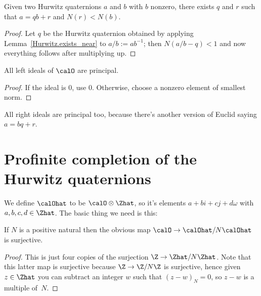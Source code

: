 \begin{lemma}
    \label{Hurwitz.quot_rem}
    \leanok
    Given two Hurwitz quaternions $a$ and $b$ with $b$ nonzero, there exists
    $q$ and $r$ such that $a=qb+r$ and $N(r)<N(b)$.
\end{lemma}
\begin{proof}
    \leanok
  Let $q$ be the Hurwitz quaternion obtained by applying Lemma~\ref{Hurwitz.exists_near}
  to $a/b := ab^{-1}$; then $N(a/b-q)<1$ and now everything follows after multiplying up.
\end{proof}

\begin{corollary}
    \label{Hurwitz.left_ideal_princ}
    \leanok
    All left ideals of $\calO$ are principal.
\end{corollary}
\begin{proof}
    \leanok
    If the ideal is 0, use 0. Otherwise, choose a nonzero element of smallest norm.
\end{proof}

\begin{remark}
    All right ideals are principal too, because there's
    another version of Euclid saying $a=bq+r$.
\end{remark}

\section{Profinite completion of the Hurwitz quaternions}

We define $\calOhat$ to be $\calO\otimes\Zhat$, so it's elements $a+bi+cj+d\omega$
with $a,b,c,d\in\Zhat$. The basic thing we need is this:

\begin{theorem}
    \label{Hurwitz.surjective_pnat_quotient}
    \leanok
    If $N$ is a positive natural then the obvious map $\calO\to\calOhat/N\calOhat$ is surjective.
\end{theorem}
\begin{proof}
    \leanok
    This is just four copies of the surjection $\Z\to\Zhat/N\Zhat$.
    Note that this latter map is surjective because $\Z\to\Z/N\Z$ is surjective,
    hence given $z\in\Zhat$ you can subtract an integer $w$ such
    that $(z-w)_N=0$, so $z-w$ is a multiple of~$N$.
\end{proof}

